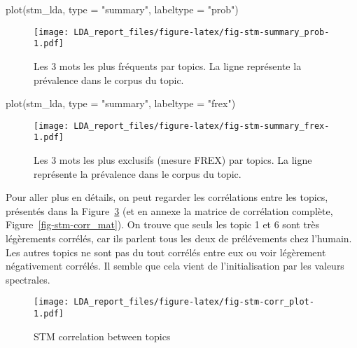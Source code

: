 \documentclass[
  letterpaper,
  DIV=11,
  numbers=noendperiod]{scrartcl}
\newenvironment{Shaded}{\begin{snugshade}}{\end{snugshade}}
\newcommand{\AttributeTok}[1]{\textcolor[rgb]{0.40,0.45,0.13}{#1}}
\newcommand{\FunctionTok}[1]{\textcolor[rgb]{0.28,0.35,0.67}{#1}}
\newcommand{\NormalTok}[1]{\textcolor[rgb]{0.00,0.23,0.31}{#1}}
\newcommand{\StringTok}[1]{\textcolor[rgb]{0.13,0.47,0.30}{#1}}
\begin{document}
\begin{Shaded}
\begin{Highlighting}[]
\FunctionTok{plot}\NormalTok{(stm\_lda, }\AttributeTok{type =} \StringTok{"summary"}\NormalTok{, }\AttributeTok{labeltype =} \StringTok{"prob"}\NormalTok{)}
\end{Highlighting}
\end{Shaded}

\begin{figure}

{\centering \texttt{[image: LDA\_report\_files/figure-latex/fig-stm-summary\_prob-1.pdf]}

}

\caption{\label{fig-stm-summary_prob}Les 3 mots les plus fréquents par
topics. La ligne représente la prévalence dans le corpus du topic.}

\end{figure}

\begin{Shaded}
\begin{Highlighting}[]
\FunctionTok{plot}\NormalTok{(stm\_lda, }\AttributeTok{type =} \StringTok{"summary"}\NormalTok{, }\AttributeTok{labeltype =} \StringTok{"frex"}\NormalTok{)}
\end{Highlighting}
\end{Shaded}

\begin{figure}

{\centering \texttt{[image: LDA\_report\_files/figure-latex/fig-stm-summary\_frex-1.pdf]}

}

\caption{\label{fig-stm-summary_frex}Les 3 mots les plus exclusifs
(mesure FREX) par topics. La ligne représente la prévalence dans le
corpus du topic.}

\end{figure}

Pour aller plus en détails, on peut regarder les corrélations entre les
topics, présentés dans la Figure~\ref{fig-stm-corr_plot} (et en annexe
la matrice de corrélation complète, Figure~\ref{fig-stm-corr_mat}). On
trouve que seuls les topic 1 et 6 sont très légèrements corrélés, car
ils parlent tous les deux de prélévements chez l'humain. Les autres
topics ne sont pas du tout corrélés entre eux ou voir légèrement
négativement corrélés. Il semble que cela vient de l'initialisation par
les valeurs spectrales.

\begin{figure}

{\centering \texttt{[image: LDA\_report\_files/figure-latex/fig-stm-corr\_plot-1.pdf]}

}

\caption{\label{fig-stm-corr_plot}STM correlation between topics}

\end{figure}
\end{document}
